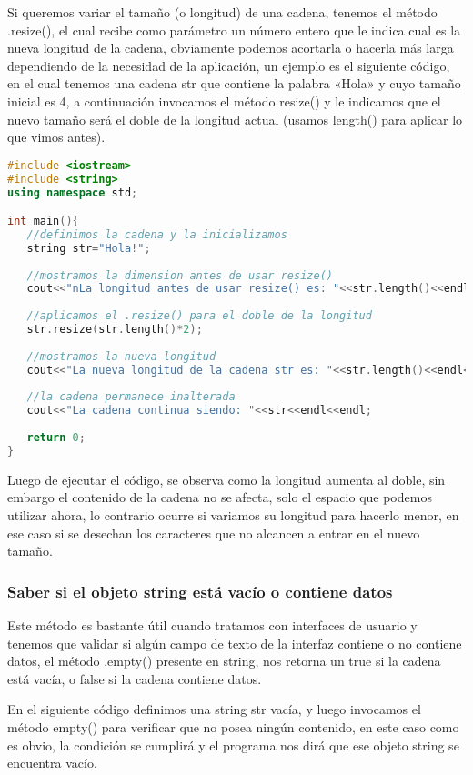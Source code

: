 Si queremos variar el tamaño (o longitud) de una cadena, tenemos el método .resize(), el cual recibe como parámetro un número entero que le indica cual es la nueva longitud de la cadena, obviamente podemos acortarla o hacerla más larga dependiendo de la necesidad de la aplicación, un ejemplo es el siguiente código, en el cual tenemos una cadena str que contiene la palabra «Hola» y cuyo tamaño inicial es 4, a continuación invocamos el método resize() y le indicamos que el nuevo tamaño será el doble de la longitud actual (usamos length() para aplicar lo que vimos antes).

\begin{lstlisting}[language=C++]
#include <iostream>
#include <string>
using namespace std;

int main(){
   //definimos la cadena y la inicializamos
   string str="Hola!";
	
   //mostramos la dimension antes de usar resize()
   cout<<"nLa longitud antes de usar resize() es: "<<str.length()<<endl<<endl;
	
   //aplicamos el .resize() para el doble de la longitud
   str.resize(str.length()*2);
	
   //mostramos la nueva longitud
   cout<<"La nueva longitud de la cadena str es: "<<str.length()<<endl<<endl;
	
   //la cadena permanece inalterada
   cout<<"La cadena continua siendo: "<<str<<endl<<endl;
	
   return 0;
}
\end{lstlisting}

Luego de ejecutar el código, se observa como la longitud aumenta al doble, sin embargo el contenido de la cadena no se afecta, solo el espacio que podemos utilizar ahora, lo contrario ocurre si variamos su longitud para hacerlo menor, en ese caso si se desechan los caracteres que no alcancen a entrar en el nuevo tamaño.

\subsubsection{Saber si el objeto string está vacío o contiene datos}

Este método es bastante útil cuando tratamos con interfaces de usuario y tenemos que validar si algún campo de texto de la interfaz contiene o no contiene datos, el método .empty() presente en string, nos retorna un true si la cadena está vacía, o false si la cadena contiene datos.

En el siguiente código definimos una string str vacía, y luego invocamos el método empty() para verificar que no posea ningún contenido, en este caso como es obvio, la condición se cumplirá y el programa nos dirá que ese objeto string se encuentra vacío.

